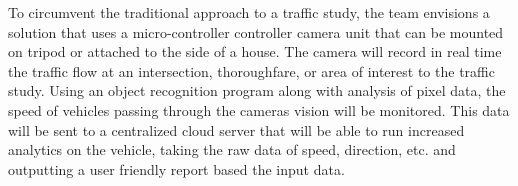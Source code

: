 To circumvent the traditional approach to a traffic study, the team envisions a solution that uses a micro-controller controller camera unit that can be mounted on tripod or attached to the side of a house. The camera will record in real time the traffic flow at an intersection, thoroughfare, or area of interest to the traffic study. Using an object recognition program along with analysis of pixel data, the speed of vehicles passing through the cameras vision will be monitored. This data will be sent to a centralized cloud server that will be able to run increased analytics on the vehicle, taking the raw data of speed, direction, etc. and outputting a user friendly report based the input data.